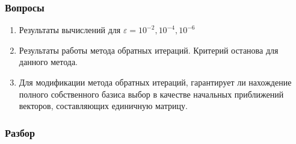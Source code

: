 \documentclass[12pt]{article}
\date{}
\author{}
\begin{document}
\subsubsection*{Вопросы}
\begin{enumerate}
	\item Результаты вычислений для $\varepsilon=10^{-2}, 10^{-4}, 10^{-6}$
	\item Результаты работы метода обратных итераций. Критерий останова для данного метода.
	\item Для модификации метода обратных итераций, гарантирует ли нахождение полного собственного базиса выбор в качестве начальных приближений векторов, составляющих единичную матрицу.
\end{enumerate}



\subsubsection*{Разбор}
\end{document}
